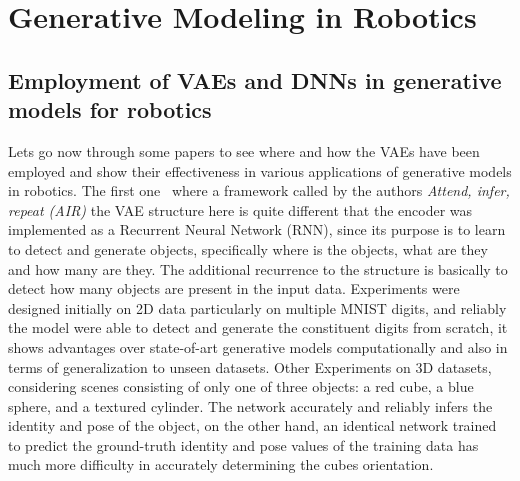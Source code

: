 

\pagestyle{fancy} 
\chapter{Generative Modeling in Robotics}
\label{cha:2}
\vspace{1cm}

\section{Employment of VAEs and DNNs in generative models for robotics}
\label{sec:VAE_generative}
Lets go now through some papers to see where and how the VAEs have been employed and show their effectiveness in various applications of generative models in robotics. The first one~\cite{eslami2016attend} where a framework called by the authors \textsl{Attend, infer, repeat (AIR)} the VAE structure here is quite different that the encoder was implemented as a Recurrent Neural Network (RNN), since its purpose is to learn to detect and generate objects, specifically \textacutedbl where is the objects, what are they and how many are they\textgravedbl. The additional recurrence to the structure is basically to detect how many objects are present in the input data. Experiments were designed initially on 2D data particularly on multiple MNIST digits, and reliably the model were able to detect and generate the constituent digits from scratch, it shows advantages over state-of-art generative models computationally and also in terms of generalization to unseen datasets. Other Experiments on 3D datasets, considering scenes consisting of only one of three objects: a red cube, a blue sphere, and a textured cylinder. The network accurately and reliably infers the identity and pose of the object, on the other hand, an identical network trained to predict the ground-truth identity and pose values of the training data has much more difficulty in accurately determining the cube\textquotesingle s orientation.\\

